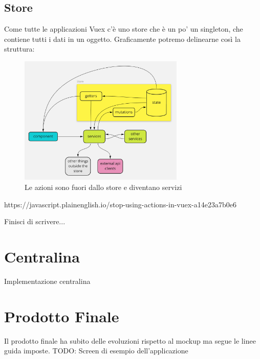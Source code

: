 \subsection{Store}
Come tutte le applicazioni Vuex c'è uno store che è un po' un singleton, che contiene tutti i dati in un oggetto.
Graficamente potremo delinearne così la struttura:
\begin{figure}[H]
    \caption{Le azioni sono fuori dallo store e diventano servizi}
    \label{fig:Store}
    \centering
    \includegraphics[width=0.7\textwidth]{Images/store.png}
\end{figure}
https://javascript.plainenglish.io/stop-using-actions-in-vuex-a14e23a7b0e6

Finisci di scrivere...

\section{Centralina}
Implementazione centralina


\section{Prodotto Finale}
\label{prodottofinale}
Il prodotto finale ha subito delle evoluzioni rispetto al mockup ma segue le linee
guida imposte.
TODO: Screen di esempio dell'applicazione